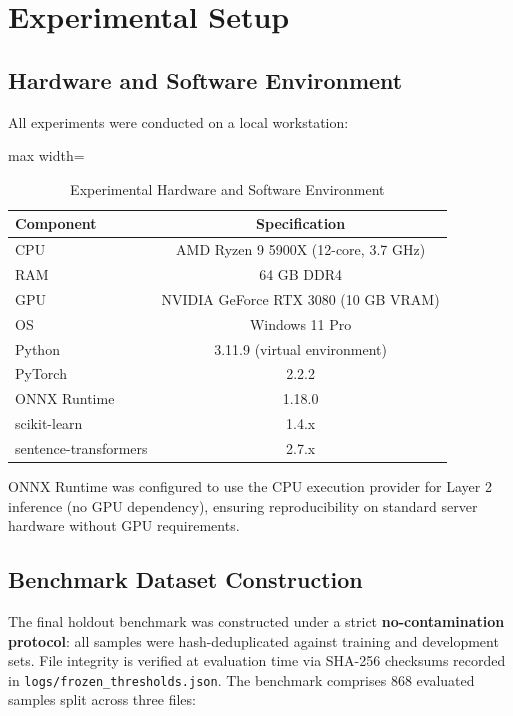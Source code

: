 \documentclass[conference]{IEEEtran}
\begin{document}
\section{Experimental Setup}

\subsection{Hardware and Software Environment}

All experiments were conducted on a local workstation:


\begin{table}[!t]
\centering
\caption{Experimental Hardware and Software Environment}
\label{tab:3}
\scriptsize
\begin{adjustbox}{max width=\columnwidth}
\begin{tabular}{lc}
\toprule
Component & Specification \\
\midrule
CPU & AMD Ryzen 9 5900X (12-core, 3.7 GHz) \\
RAM & 64 GB DDR4 \\
GPU & NVIDIA GeForce RTX 3080 (10 GB VRAM) \\
OS & Windows 11 Pro \\
Python & 3.11.9 (virtual environment) \\
PyTorch & 2.2.2 \\
ONNX Runtime & 1.18.0 \\
scikit-learn & 1.4.x \\
sentence-transformers & 2.7.x \\
\bottomrule
\end{tabular}
\end{adjustbox}
\end{table}


ONNX Runtime was configured to use the CPU execution provider for Layer 2 inference (no GPU dependency), ensuring reproducibility on standard server hardware without GPU requirements.


\subsection{Benchmark Dataset Construction}

The final holdout benchmark was constructed under a strict \textbf{no-contamination protocol}: all samples were hash-deduplicated against training and development sets. File integrity is verified at evaluation time via SHA-256 checksums recorded in \texttt{logs/frozen\_thresholds.json}. The benchmark comprises 868 evaluated samples split across three files:
\end{document}

